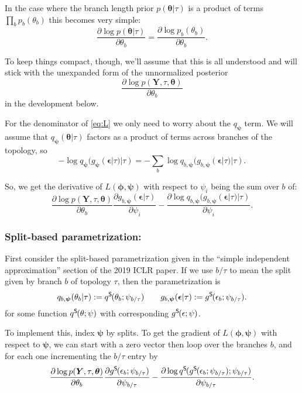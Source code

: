 \documentclass{article}
\newcommand{\qSplit}{q^\textsf{S}\hspace{-1pt}}
\newcommand{\gSplit}{g^\textsf{S}\hspace{-1pt}}
\begin{document}
In the case where the branch length prior $p(\bm\theta | \tau)$ is a product of terms $\prod_b p_b(\theta_b)$ this becomes very simple:
\[
    \frac{\partial \log p(\bm\theta | \tau)}{\partial \theta_b} =
    \frac{\partial \log p_b(\theta_b)}{\partial \theta_b}.
\]

To keep things compact, though, we'll assume that this is all understood and will stick with the unexpanded form of the unnormalized posterior
\[
    \frac{\partial \log p(\bm{Y}, \tau, \bm\theta)}{\partial \theta_b}
\]
in the development below.

For the denominator of \eqref{eq:L} we only need to worry about the $q_{\bm\psi}$ term.
We will assume that $q_{\bm\psi}(\bm\theta | \tau)$ factors as a product of terms across branches of the topology, so
\[
    - \log q_{\bm{\psi}}(g_{\bm{\psi}}(\bm{\epsilon}|\tau)|\tau) =
    - \sum_b \log q_{b, \bm{\psi}}(g_{b, \bm{\psi}}(\bm{\epsilon}|\tau)|\tau).
\]

So, we get the derivative of $L(\bm\phi, \bm\psi)$ with respect to $\psi_i$ being the sum over $b$ of:
\begin{equation}
    \frac{\partial \log p(\bm{Y}, \tau, \bm\theta)}{\partial \theta_b}
    \frac{\partial g_{b,\bm\psi}(\bm\epsilon | \tau)}{\partial \psi_i}
    - \frac{\partial \log q_{b, \bm\psi}(g_{b, \bm\psi}(\bm\epsilon|\tau)|\tau)}{\partial \psi_i}.
    \label{eq:dLdPsi}
\end{equation}

\subsubsection*{Split-based parametrization:}
First consider the split-based parametrization given in the ``simple independent approximation'' section of the 2019 ICLR paper.
If we use $b \slash \tau$ to mean the split given by branch $b$ of topology $\tau$, then the parametrization is
\[
q_{b, \bm{\psi}}(\theta_b | \tau) := \qSplit(\theta_b; \psi_{b \slash \tau})
\qquad
g_{b,\bm\psi}(\bm\epsilon | \tau) := \gSplit(\epsilon_b; \psi_{b \slash \tau}).
\]
for some function $\qSplit(\theta; \psi)$ with corresponding $\gSplit(\epsilon; \psi)$.

To implement this, index $\bm\psi$ by splits.
To get the gradient of $L(\bm\phi, \bm\psi)$ with respect to $\bm\psi$, we can start with a zero vector then loop over the branches $b$, and for each one incrementing the $b \slash \tau$ entry by
\begin{equation*}
    \frac{\partial \log p(\bm{Y}, \tau, \bm\theta)}{\partial \theta_b}
    \frac{\partial \gSplit(\epsilon_b; \psi_{b \slash \tau})}{\partial \psi_{b \slash \tau}}
    - \frac{\partial \log \qSplit(\gSplit(\epsilon_b; \psi_{b \slash \tau}); \psi_{b \slash \tau})}{\partial \psi_{b \slash \tau}}.
\end{equation*}
\end{document}
